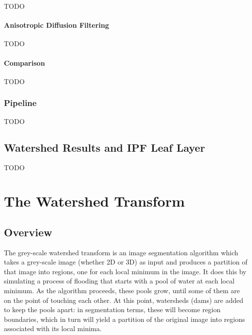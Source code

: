 TODO

\paragraph{Anisotropic Diffusion Filtering}

TODO

\paragraph{Comparison}

TODO

\subsubsection{Pipeline}

TODO

\subsection{Watershed Results and IPF Leaf Layer}

TODO

\iffalse

\section{The Watershed Transform}

\subsection{Overview}

The grey-scale watershed transform is an image segmentation algorithm which takes a grey-scale image (whether 2D or 3D) as input and produces a partition of that image into regions, one for each local minimum in the image. It does this by simulating a process of flooding that starts with a pool of water at each local minimum. As the algorithm proceeds, these pools grow, until some of them are on the point of touching each other. At this point, watersheds (dams) are added to keep the pools apart: in segmentation terms, these will become region boundaries, which in turn will yield a partition of the original image into regions associated with its local minima.


